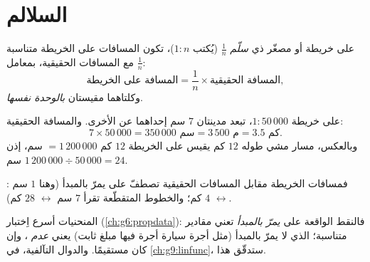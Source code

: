 \section{السلالم}

\begin{definition}[السلّم]\label{def:g7:prop:scale}
على خريطة أو  مصغّر ذي \emph{سلّم}
$\frac{1}{n}$ (يُكتب $1 : n$)، تكون المسافات على الخريطة
متناسبة مع المسافات الحقيقية، بمعامل $\frac1n$:
\[
\text{المسافة على الخريطة} = \frac{1}{n} \times \text{المسافة الحقيقية},
\]
وكلتاهما مقيستان \emph{بالوحدة نفسها}.
\end{definition}

\begin{example}\label{ex:g7:prop:scale}
على خريطة $1 : 50\,000$، تبعد مدينتان $7$ سم إحداهما عن الأخرى. والمسافة الحقيقية:
\[
7 \times 50\,000 = 350\,000 \text{ سم} = 3\,500 \text{ م} = 3.5
\text{ كم}.
\]
وبالعكس، مسار مشي طوله $12$ كم يقيس على الخريطة
$12$ كم $= 1\,200\,000$ سم، إذن $1\,200\,000 \div 50\,000 = 24$ سم.
\end{example}

\begin{omfigure}

{\small {} : فمسافات الخريطة مقابل المسافات
الحقيقية تصطفّ على  يمرّ بالمبدأ (وهنا
$1$ سم $\leftrightarrow$ $4$ كم؛ والخطوط المتقطّعة تقرأ $7$ سم
$\leftrightarrow$ $28$ كم).}
\end{omfigure}

\begin{remark}
المنحنيات أسرع اِختبار 
(\cref{ch:g6:propdata}): فالنقط الواقعة على  \emph{يمرّ
بالمبدأ} تعني مقادير متناسبة؛  الذي لا يمرّ بالمبدأ (مثل
أجرة سيارة أجرة فيها مبلغ ثابت) يعني \emph{عدم} ، وإن
كان مستقيمًا. والدوال التآلفية، في
\cref{ch:g9:linfunc}، ستدقّق هذا.
\end{remark}

